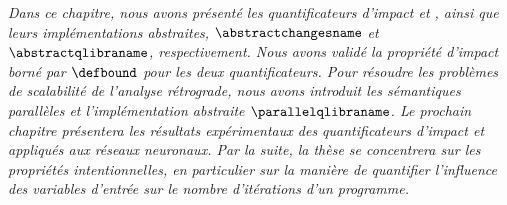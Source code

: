 \frenchdiv

\emph{Dans ce chapitre, nous avons présenté les quantificateurs d'impact \changesname{} et \qlibraname{}, ainsi que leurs implémentations abstraites, $\abstractchangesname$ et $\abstractqlibraname$, respectivement. Nous avons validé la propriété d'impact borné par $\defbound$ pour les deux quantificateurs. Pour résoudre les problèmes de scalabilité de l'analyse rétrograde, nous avons introduit les sémantiques parallèles et l'implémentation abstraite $\parallelqlibraname$. Le prochain chapitre présentera les résultats expérimentaux des quantificateurs d'impact \changesname{} et \qlibraname{} appliqués aux réseaux neuronaux. Par la suite, la thèse se concentrera sur les propriétés intentionnelles, en particulier sur la manière de quantifier l'influence des variables d'entrée sur le nombre d'itérations d'un programme.}
